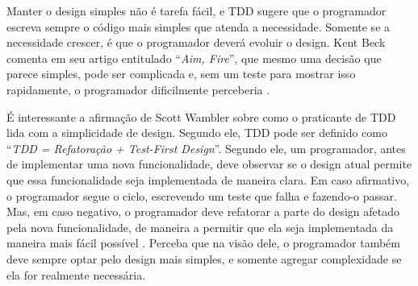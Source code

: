 Manter o design simples não é tarefa fácil, e TDD sugere que o programador
escreva sempre o código mais simples que atenda a necessidade. Somente se a
necessidade crescer, é que o programador deverá evoluir o design. Kent Beck
comenta em seu artigo entitulado ``\textit{Aim, Fire}'', que mesmo uma decisão que
parece simples, pode ser complicada e, sem um teste para mostrar isso rapidamente, o
programador dificilmente perceberia \cite{aim-fire}. 

É interessante a afirmação de Scott Wambler sobre como o praticante de TDD lida
com a simplicidade de design. Segundo ele, TDD pode ser definido como
``\textit{TDD = Refatoração + Test-First Design}''. Segundo ele, um programador,
antes de implementar uma nova funcionalidade, deve observar se o design atual
permite que essa funcionalidade seja implementada de maneira clara. Em caso
afirmativo, o programador segue o ciclo, escrevendo um teste que falha e
fazendo-o passar. Mas, em caso negativo, o programador deve refatorar a parte do
design afetado pela nova funcionalidade, de maneira a permitir que ela seja
implementada da maneira mais fácil possível \cite{wambler-tdd}. Perceba que na
visão dele, o programador também deve sempre optar pelo design mais simples, e
somente agregar complexidade se ela for realmente necessária.

